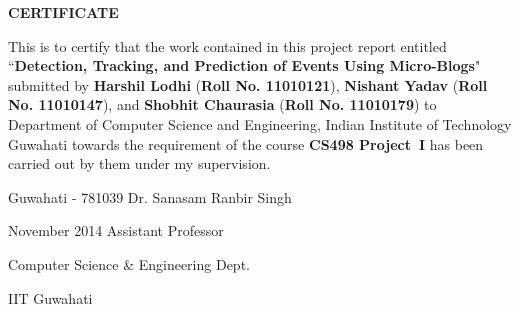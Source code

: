 \documentclass[12pt,a4paper]{report}
\begin{document}

 \setcounter{page}{2}
\begin{center}
{\Large{\bf{CERTIFICATE}}}
\end{center}

\noindent
This is to certify that the work contained in this project report
entitled ``{\bf Detection, Tracking, and Prediction of Events Using Micro-Blogs}" submitted
by {\bf Harshil Lodhi} (\small{{\bf Roll No. 11010121})}, {\bf Nishant Yadav} (\small{{\bf Roll No. 11010147})}, 
and {\bf Shobhit Chaurasia} (\small{{\bf Roll No. 11010179})} to Department of Computer Science and Engineering, 
Indian Institute of Technology Guwahati
towards the requirement of the course \textbf{CS498 Project~I}
has been carried out by them under my
supervision.

\vspace{4cm}

\noindent Guwahati - 781039 \hfill Dr. Sanasam Ranbir Singh

\noindent November 2014 \hfill \small{Assistant Professor}

\hfill \small{Computer Science \& Engineering Dept.}

\hfill \small{IIT Guwahati}

\clearpage
\end{document}
